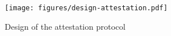 
\begin{figure}%
    \centering
\texttt{[image: figures/design-attestation.pdf]}%
\vspace{-1mm}
\caption{Design of the attestation protocol}%
\label{fig:design-trusted-monitor}%
\vspace{-2mm}
\end{figure}